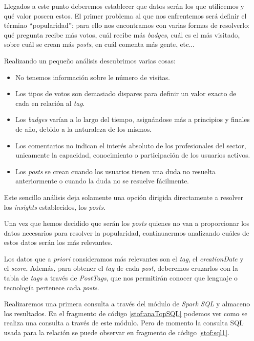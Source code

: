 Llegados a este punto deberemos establecer que datos serán los que utilicemos y qué valor poseen estos. El primer problema al que nos enfrentemos será definir el término ``popularidad''; para ello nos encontramos con varias formas de resolverlo: qué pregunta recibe más votos, cuál recibe más \textit{badges}, cuál es el más visitado, sobre cuál se crean más \textit{posts}, en cuál comenta más gente, etc...

Realizando un pequeño análisis descubrimos varias cosas:
\begin{itemize}
	\item No tenemos información sobre le número de visitas.
	\item Los tipos de votos son demasiado dispares para definir un valor exacto de cada en relación al \textit{tag}.
	\item Los \textit{badges} varían a lo largo del tiempo, asignándose más a principios y finales de año, debido a la naturaleza de los mismos.
	\item Los comentarios no indican el interés absoluto de los profesionales del sector, unicamente la capacidad, conocimiento o participación de los usuarios activos.
	\item Los \textit{posts} se crean cuando los usuarios tienen una duda no resuelta anteriormente o cuando la duda no se resuelve fácilmente.
\end{itemize}

Este sencillo análisis deja solamente una opción dirigida directamente a resolver los \textit{insights} establecidos, los \textit{posts}.

Una vez que hemos decidido que serán los \textit{posts} quienes no  van a proporcionar los datos necesarios para resolver la popularidad, continuaermos analizando cuáles de estos datos serán los más relevantes. 

Los datos que a \textit{priori} consideramos más relevantes son el \textit{tag}, el \textit{creationDate} y el \textit{score}. Además, para obtener el \textit{tag} de cada \textit{post}, deberemos cruzarlos con la tabla de \textit{tags} a través de \textit{PostTags}, que nos permitirán conocer que lenguaje o tecnología pertenece cada \textit{posts}.

Realizaremos una primera consulta a través del módulo de \textit{Spark SQL} y almaceno los resultados. En el fragmento de código \ref{stof:anaTopSQL} podemos ver como se realiza una consulta a través de este módulo. Pero de momento la consulta \gls{SQL} usada para la relación se puede observar en fragmento de código \ref{stof:sql1}.

